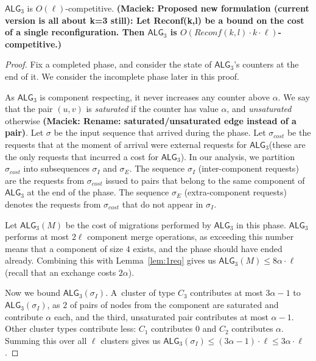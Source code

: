 \documentclass[manuscript,screen=true, review, anonymous]{acmart}
\newcommand{\TAlg}{{\ensuremath{\textsf{ALG}_{3}}}\xspace}
\newcommand\maciek[1]{\color{brown}\textbf{(Maciek: #1)}\color{black}}
\begin{document}
\begin{theorem}
	\TAlg is $O(\ell)$-competitive.
	\maciek{Proposed new formulation (current version is all about k=3 still): Let Reconf(k,l) be a bound on the cost of a single reconfiguration. Then \TAlg is $O(Reconf(k,l)\cdot k \cdot \ell)$-competitive.}
\end{theorem}
\begin{proof}
	Fix a completed phase, and consider the state of \TAlg's counters at the end of it.
	We consider the incomplete phase later in this proof.
	
	As \TAlg is component respecting, it never increases any counter above $\alpha$.
	We say that the pair $(u, v)$ is \emph{saturated} if the counter has value $\alpha$, and \emph{unsaturated} otherwise \maciek{Rename: saturated/unsaturated edge instead of a pair}.
	Let $\sigma$ be the input sequence that arrived during the phase.
	Let $\sigma_{cost}$ be the requests that at the moment of arrival were external requests for \TAlg (these are the only requests that incurred a cost for \TAlg).
	In our analysis, we partition $\sigma_{cost}$ into subsequences $\sigma_I$ and $\sigma_E$.
	The sequence $\sigma_I$ (inter-component requests) are the requests from $\sigma_{cost}$ issued to pairs that belong to the same component of \TAlg at the end of the phase.
	The sequence $\sigma_E$ (extra-component requests) denotes the requests from $\sigma_{cost}$ that do not appear in $\sigma_I$.
	
	
	Let $\TAlg(M)$ be the cost of migrations performed by \TAlg in this phase.
	\TAlg performs at most $2 \ell$ component merge operations, as
	exceeding this number means that a component of size $4$ exists, and the phase should have ended already.
	Combining this with Lemma~\ref{lem:1req} gives us $\TAlg(M) \leq 8\alpha\cdot\ell$ (recall that an exchange costs $2\alpha$).
	
	Now we bound $\TAlg(\sigma_I)$.
	A~cluster of type $C_3$ contributes at most $3 \alpha - 1$ to $\TAlg(\sigma_I)$, as $2$ of pairs of nodes from the component are saturated and contribute $\alpha$ each, and the third, unsaturated pair contributes at most $\alpha-1$.
	Other cluster types contribute less: $C_1$ contributes $0$ and $C_2$ contributes $\alpha$.
	Summing this over all $\ell$ clusters gives us $\TAlg(\sigma_I) \leq (3 \alpha-1)\cdot \ell \leq 3\alpha\cdot\ell$.
	

\end{proof}
\end{document}
